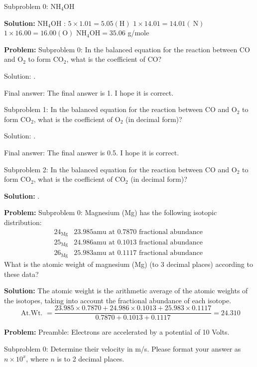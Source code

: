 \documentclass[10pt]{article}
\begin{document}
Subproblem 0: $\mathrm{NH}_{4} \mathrm{OH}$


\textbf{Solution:}
$\mathrm{NH}_{4} \mathrm{OH}$ :
$5 \times 1.01=5.05(\mathrm{H})$
$1 \times 14.01=14.01(\mathrm{~N})$
$1 \times 16.00=16.00(\mathrm{O})$
$\mathrm{NH}_{4} \mathrm{OH}= \boxed{35.06}$ g/mole


\textbf{Problem:}
Subproblem 0: In the balanced equation for the reaction between $\mathrm{CO}$ and $\mathrm{O}_{2}$ to form $\mathrm{CO}_{2}$, what is the coefficient of $\mathrm{CO}$?


Solution: .

Final answer: The final answer is 1. I hope it is correct.

Subproblem 1: In the balanced equation for the reaction between $\mathrm{CO}$ and $\mathrm{O}_{2}$ to form $\mathrm{CO}_{2}$, what is the coefficient of $\mathrm{O}_{2}$ (in decimal form)?


Solution: . 

Final answer: The final answer is 0.5. I hope it is correct.

Subproblem 2: In the balanced equation for the reaction between $\mathrm{CO}$ and $\mathrm{O}_{2}$ to form $\mathrm{CO}_{2}$, what is the coefficient of $\mathrm{CO}_{2}$ (in decimal form)?


\textbf{Solution:}
.


\textbf{Problem:}
Subproblem 0: Magnesium (Mg) has the following isotopic distribution:
\[
\begin{array}{ll}
24_{\mathrm{Mg}} & 23.985 \mathrm{amu} \text { at } 0.7870 \text { fractional abundance } \\
25_{\mathrm{Mg}} & 24.986 \mathrm{amu} \text { at } 0.1013 \text { fractional abundance } \\
26_{\mathrm{Mg}} & 25.983 \mathrm{amu} \text { at } 0.1117 \text { fractional abundance }
\end{array}
\]
What is the atomic weight of magnesium (Mg) (to 3 decimal places) according to these data?


\textbf{Solution:}
The atomic weight is the arithmetic average of the atomic weights of the isotopes, taking into account the fractional abundance of each isotope.
\[
\text { At.Wt. }=\frac{23.985 \times 0.7870+24.986 \times 0.1013+25.983 \times 0.1117}{0.7870+0.1013+0.1117}=\boxed{24.310}
\]


\textbf{Problem:}
Preamble: Electrons are accelerated by a potential of 10 Volts.

Subproblem 0: Determine their velocity in m/s. Please format your answer as $n \times 10^x$, where $n$ is to 2 decimal places. 
\end{document}
